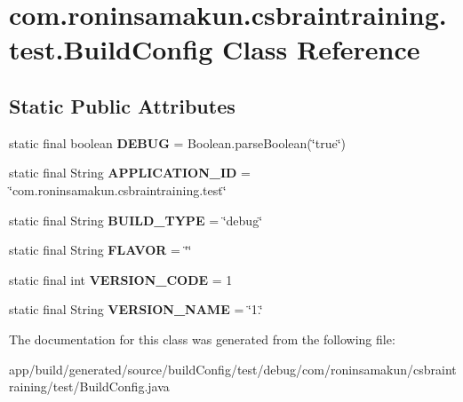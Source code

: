 \section{com.\+roninsamakun.\+csbraintraining.\+test.\+Build\+Config Class Reference}
\label{classcom_1_1roninsamakun_1_1csbraintraining_1_1test_1_1_build_config}
\subsection*{Static Public Attributes}
\begin{DoxyCompactItemize}
\item 
static final boolean {\bfseries D\+E\+B\+U\+G} = Boolean.\+parse\+Boolean(\char`\"{}true\char`\"{})\label{classcom_1_1roninsamakun_1_1csbraintraining_1_1test_1_1_build_config_a32a74c46fb9d444030b82b70e50d6db3}

\item 
static final String {\bfseries A\+P\+P\+L\+I\+C\+A\+T\+I\+O\+N\+\_\+\+I\+D} = \char`\"{}com.\+roninsamakun.\+csbraintraining.\+test\char`\"{}\label{classcom_1_1roninsamakun_1_1csbraintraining_1_1test_1_1_build_config_a3791fb504c3bece03c540d4b944c950e}

\item 
static final String {\bfseries B\+U\+I\+L\+D\+\_\+\+T\+Y\+P\+E} = \char`\"{}debug\char`\"{}\label{classcom_1_1roninsamakun_1_1csbraintraining_1_1test_1_1_build_config_a5aedc10c21b10f571eea4933a06c6baa}

\item 
static final String {\bfseries F\+L\+A\+V\+O\+R} = \char`\"{}\char`\"{}\label{classcom_1_1roninsamakun_1_1csbraintraining_1_1test_1_1_build_config_ad084ed05b380b823261541a0d94626d7}

\item 
static final int {\bfseries V\+E\+R\+S\+I\+O\+N\+\_\+\+C\+O\+D\+E} = 1\label{classcom_1_1roninsamakun_1_1csbraintraining_1_1test_1_1_build_config_ad4328190954a0b43a7c99ee94658b954}

\item 
static final String {\bfseries V\+E\+R\+S\+I\+O\+N\+\_\+\+N\+A\+M\+E} = \char`\"{}1.\char`\"{}\label{classcom_1_1roninsamakun_1_1csbraintraining_1_1test_1_1_build_config_a707bc4f6dae056f97a713345901ef1e4}

\end{DoxyCompactItemize}


The documentation for this class was generated from the following file\+:\begin{DoxyCompactItemize}
\item 
app/build/generated/source/build\+Config/test/debug/com/roninsamakun/csbraintraining/test/Build\+Config.\+java\end{DoxyCompactItemize}
